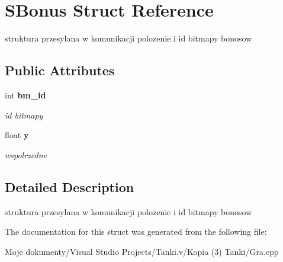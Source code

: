 \section{SBonus Struct Reference}
\label{struct_s_bonus}
struktura przesylana w komunikacji polozenie i id bitmapy bonosow  


\subsection*{Public Attributes}
\begin{CompactItemize}
\item 
int {\bf bm\_\-id}\label{struct_s_bonus_3b0eb3383ccb68906183719a16d66809}

\begin{CompactList}\small\item\em id bitmapy \item\end{CompactList}\item 
float {\bf y}\label{struct_s_bonus_68ebf510079e1dfe49640143c3564b83}

\begin{CompactList}\small\item\em wspolrzedne \item\end{CompactList}\end{CompactItemize}


\subsection{Detailed Description}
struktura przesylana w komunikacji polozenie i id bitmapy bonosow 



The documentation for this struct was generated from the following file:\begin{CompactItemize}
\item 
Moje dokumenty/Visual Studio Projects/Tanki.v/Kopia (3) Tanki/Gra.cpp\end{CompactItemize}

